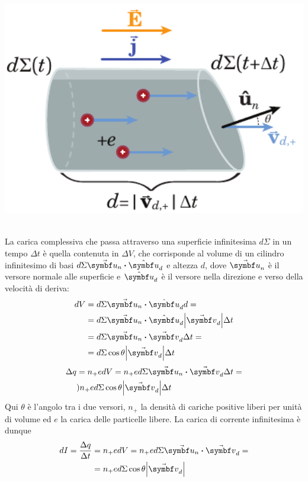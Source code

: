 \begin{minipage}{0.34\textwidth}
	\begin{center}
		\includegraphics[width=1\textwidth]{images/chp5/chp5correntecavo1.pdf}
	\end{center}
\end{minipage}\\
La carica complessiva che passa attraverso una superficie infinitesima $d\Sigma$ in un tempo $\Delta t$ è quella contenuta in $\Delta V$, che corrisponde al volume di un cilindro infinitesimo di basi $d\Sigma\vba{u_n}\vdot\vbh{u}_d$ e altezza $d$, dove $\vba{u}_n$ è il versore normale alle superficie e $\vbh{u}_d$ è il versore nella direzione e verso della velocità di deriva:
\begin{align*}
	dV&=d\Sigma\vba{u_n}\vdot\vbh{u}_d d=\\
	&=d\Sigma\vba{u_n}\vdot\vbh{u}_d \abs{\vba{v}_d}\Delta t\\
	&=d\Sigma\vba{u_n}\vdot\vba{v}_d \Delta t =\\
	&=d\Sigma\cos\theta\abs{\vba{v}_d}\Delta t
\end{align*}
\begin{align*}
	\Delta q&=n_{+}edV=n_{+}e d\Sigma\vba{u_n}\vdot\vba{v}_d \Delta t=\\
	&)n_{+}e  d\Sigma\cos\theta\abs{\vba{v}_d}\Delta t
\end{align*}
Qui $\theta$ è l'angolo tra i due versori, $n_{+}$ la densità di cariche positive liberi per unità di volume ed $e$ la carica delle particelle libere. La carica di corrente infinitesima è dunque
\begin{align*}
	dI=\frac{\Delta q}{\Delta t}&=n_{+}edV=n_{+}e d\Sigma\vba{u_n}\vdot\vba{v}_d=\\
	&=n_{+}e  d\Sigma\cos\theta\abs{\vba{v}_d}
\end{align*}
